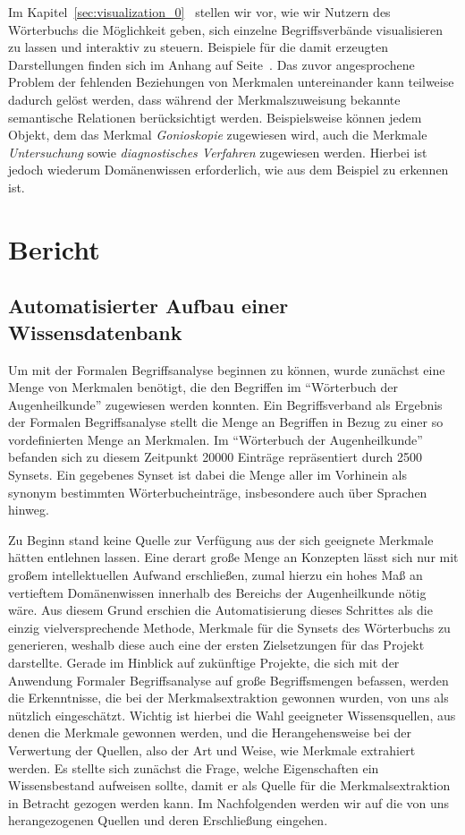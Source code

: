 \documentclass[pagesize,paper=A4,DIV=calc,fontsize=12pt,draft=false]{scrreprt}
\begin{document}
Im Kapitel~\ref{sec:visualization_0}\emph{~} stellen wir vor, wie wir Nutzern des Wörterbuchs die Möglichkeit geben, sich einzelne Begriffsverbände visualisieren zu lassen und interaktiv zu steuern.
Beispiele für die damit erzeugten Darstellungen finden sich im Anhang auf Seite~\pageref{sec:visualization_01}. 
Das zuvor angesprochene Problem der fehlenden Beziehungen von Merkmalen untereinander kann teilweise dadurch gelöst werden, dass während der Merkmalszuweisung bekannte semantische Relationen berücksichtigt werden. 
Beispielsweise können jedem Objekt, dem das Merkmal \emph{Gonioskopie} zugewiesen wird, auch die Merkmale \emph{Untersuchung} sowie \emph{diagnostisches Verfahren} zugewiesen werden. 
Hierbei ist jedoch wiederum Domänenwissen erforderlich, wie aus dem Beispiel zu erkennen ist. 

\chapter{Bericht}

\section{Automatisierter Aufbau einer Wissensdatenbank}

Um mit der Formalen Begriffsanalyse beginnen zu können, wurde zunächst eine Menge von Merkmalen benötigt, die den Begriffen im \enquote{Wörterbuch der Augenheilkunde} zugewiesen werden konnten. 
Ein Begriffsverband als Ergebnis der Formalen Begriffsanalyse stellt die Menge an Begriffen in Bezug zu einer so vordefinierten Menge an Merkmalen. 
Im \enquote{Wörterbuch der Augenheilkunde} befanden sich zu diesem Zeitpunkt 20000 Einträge repräsentiert durch 2500 Synsets. 
Ein gegebenes Synset ist dabei die Menge aller im Vorhinein als synonym bestimmten Wörterbucheinträge, insbesondere auch über Sprachen hinweg. 

Zu Beginn stand keine Quelle zur Verfügung aus der sich geeignete Merkmale hätten entlehnen lassen. 
Eine derart große Menge an Konzepten lässt sich nur mit großem intellektuellen Aufwand erschließen, zumal hierzu ein hohes Maß an vertieftem Domänenwissen innerhalb des Bereichs der Augenheilkunde nötig wäre. 
Aus diesem Grund erschien die Automatisierung dieses Schrittes als die einzig vielversprechende Methode, Merkmale für die Synsets des Wörterbuchs zu generieren, weshalb diese auch eine der ersten Zielsetzungen für das Projekt darstellte. 
Gerade im Hinblick auf zukünftige Projekte, die sich mit der Anwendung Formaler Begriffsanalyse auf große Begriffsmengen befassen, werden die Erkenntnisse, die bei der Merkmalsextraktion gewonnen wurden, von uns als nützlich eingeschätzt. 
Wichtig ist hierbei die Wahl geeigneter Wissensquellen, aus denen die Merkmale gewonnen werden, und die Herangehensweise bei der Verwertung der Quellen, also der Art und Weise, wie Merkmale extrahiert werden. 
Es stellte sich zunächst die Frage, welche Eigenschaften ein Wissensbestand aufweisen sollte, damit er als Quelle für die Merkmalsextraktion in Betracht gezogen werden kann. 
Im Nachfolgenden werden wir auf die von uns herangezogenen Quellen und deren Erschließung eingehen.
\end{document}

